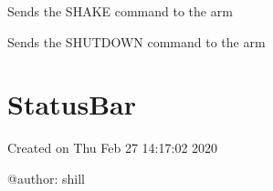\documentclass[letterpaper,10pt,english,openany,oneside]{sphinxmanual}
\begin{document}
\begin{fulllineitems}
\begin{fulllineitems}
\end{fulllineitems}


\begin{fulllineitems}
\label{\detokenize{src/serialarmcontroller:SerialArmController.SerialArmController.shake}}
Sends the SHAKE command to the arm

\end{fulllineitems}


\begin{fulllineitems}
\label{\detokenize{src/serialarmcontroller:SerialArmController.SerialArmController._shutdown}}
Sends the SHUTDOWN command to the arm

\end{fulllineitems}


\end{fulllineitems}



\chapter{StatusBar}
\label{\detokenize{src/statusbar:module-StatusBar}}\label{\detokenize{src/statusbar:statusbar}}\label{\detokenize{src/statusbar::doc}}
Created on Thu Feb 27 14:17:02 2020

@author: shill
\end{document}
